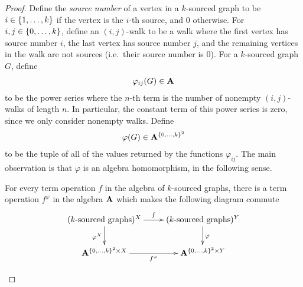 \begin{proof}
    
    
    
        
        Define the \emph{source number} of a vertex in a $k$-sourced graph to be  $i \in \{1,\ldots,k\}$ if the vertex is the $i$-th source, and $0$ otherwise. For
        $i,j \in \{0,\ldots,k\}$,
        define an  $(i,j)$-walk to be a walk where the first vertex has source number $i$, the last vertex has source number $j$, and the remaining vertices in the walk are not sources (i.e.~their source number is $0$). For a $k$-sourced graph $G$, define 
        \begin{align*}
        \varphi_{ij}(G) \in \mathbf{A}
        \end{align*}
         to be the power series where the $n$-th term is the number of nonempty $(i,j)$-walks of length $n$. In particular, the constant term  of this power series is zero, since we only consider nonempty walks. Define 
        \begin{align*}
        \varphi(G) \in \mathbf{A}^{\{0,\ldots,k\}^2}
        \end{align*}
        to be the tuple of all of the values returned by the functions $\varphi_{ij}$. 
        The main observation is that $\varphi$ is an algebra homomorphism, in the following sense.
        \begin{claim}
            For every term operation $f$ 
            in the algebra of $k$-sourced graphs, there is a term operation $f^\varphi$ in the algebra $\mathbf{A}$ which makes the following diagram commute
            \begin{align*}
            \xymatrix{
                (\text{$k$-sourced graphs})^X 
                \ar[r]^f
                \ar[d]_{\varphi^X}
                &
                 (\text{$k$-sourced graphs})^Y
                \ar[d]^\varphi
                \\
                \aalg^{\set{0,\ldots,k}^2 \times X}
                \ar[r]_{f^\varphi}
                &
                \aalg^{\set{0,\ldots,k}^2 \times Y}
            }

\end{align*}
\end{claim}
\end{proof}
